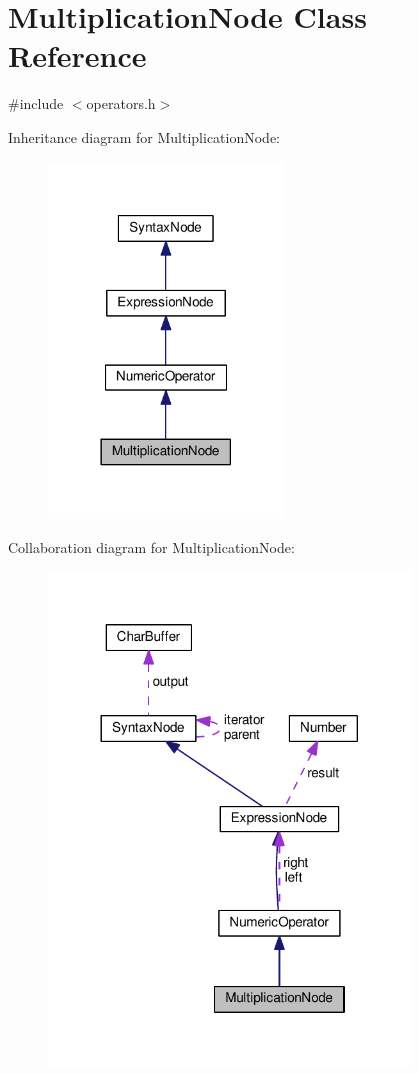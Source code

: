 \hypertarget{classMultiplicationNode}{}\section{Multiplication\+Node Class Reference}
\label{classMultiplicationNode}


{\ttfamily \#include $<$operators.\+h$>$}



Inheritance diagram for Multiplication\+Node\+:
\nopagebreak
\begin{figure}[H]
\begin{center}
\leavevmode
\includegraphics[width=177pt]{d7/d7e/classMultiplicationNode__inherit__graph}
\end{center}
\end{figure}


Collaboration diagram for Multiplication\+Node\+:
\nopagebreak
\begin{figure}[H]
\begin{center}
\leavevmode
\includegraphics[width=272pt]{d8/d6a/classMultiplicationNode__coll__graph}
\end{center}
\end{figure}
